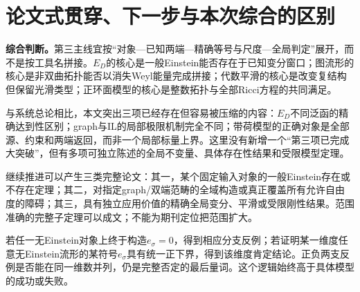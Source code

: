 \documentclass[UTF8,fontset=fandol,zihao=-4]{ctexart}
\theoremstyle{research}
\numberwithin{equation}{section}
\begin{document}
\section{论文式贯穿、下一步与本次综合的区别}
\textbf{综合判断。}第三主线宜按“对象---已知两端---精确等号与尺度---全局判定”展开，而不是按工具名拼接。$E_D$的核心是一般Einstein能否存在于已知变分窗口；图流形的核心是非双曲拓扑能否以消失Weyl能量完成拼接；代数平滑的核心是改变复结构但保留光滑类型；正环面模型的核心是整数拓扑与全部Ricci方程的共同满足。

与系统总论相比，本文突出三项已经存在但容易被压缩的内容：$E_D$不同泛函的精确达到性区别；graph与IL的局部极限机制完全不同；带荷模型的正确对象是全部源、约束和两端返回，而非一个局部标量上界。这里没有新增一个“第三项已完成大突破”，但有多项可独立陈述的全局不变量、具体存在性结果和受限模型定理。

继续推进可以产生三类完整论文：其一，某个固定输入对象的一般Einstein存在或不存在定理；其二，对指定graph/双端范畴的全域构造或真正覆盖所有允许自由度的障碍；其三，具有独立应用价值的精确全局变分、平滑或受限刚性结果。范围准确的完整子定理可以成文；不能为期刊定位把范围扩大。

若任一无Einstein对象上终于构造$e_\sigma=0$，得到相应分支反例；若证明某一维度任意无Einstein流形的某符号$e_\sigma$具有统一正下界，得到该维度肯定结论。正负两支反例是否能在同一维数并列，仍是完整否定的最后量词。这个逻辑始终高于具体模型的成功或失败。
\end{document}
